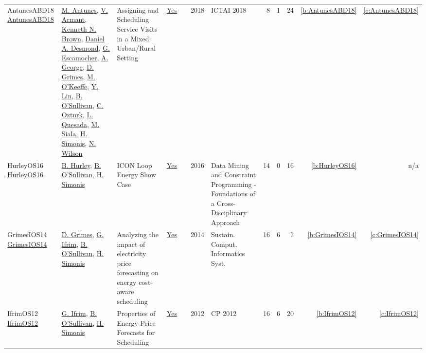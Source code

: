 {\begin{longtable}{>{\raggedright\arraybackslash}p{3cm}>{\raggedright\arraybackslash}p{6cm}>{\raggedright\arraybackslash}p{6.5cm}rrrp{2.5cm}rrrrr}
AntunesABD18 \href{https://doi.org/10.1109/ICTAI.2018.00027}{AntunesABD18} & \hyperref[auth:a891]{M. Antunes}, \hyperref[auth:a892]{V. Armant}, \hyperref[auth:a223]{Kenneth N. Brown}, \hyperref[auth:a893]{Daniel A. Desmond}, \hyperref[auth:a894]{G. Escamocher}, \hyperref[auth:a895]{A. George}, \hyperref[auth:a183]{D. Grimes}, \hyperref[auth:a896]{M. O'Keeffe}, \hyperref[auth:a897]{Y. Lin}, \hyperref[auth:a16]{B. O'Sullivan}, \hyperref[auth:a898]{C. Ozturk}, \hyperref[auth:a899]{L. Quesada}, \hyperref[auth:a130]{M. Siala}, \hyperref[auth:a17]{H. Simonis}, \hyperref[auth:a838]{N. Wilson} & Assigning and Scheduling Service Visits in a Mixed Urban/Rural Setting & \href{works/AntunesABD18.pdf}{Yes} & \cite{AntunesABD18} & 2018 & ICTAI 2018 & 8 & 1 & 24 & \ref{b:AntunesABD18} & \ref{c:AntunesABD18}\\
HurleyOS16 \href{https://doi.org/10.1007/978-3-319-50137-6\_15}{HurleyOS16} & \hyperref[auth:a900]{B. Hurley}, \hyperref[auth:a16]{B. O'Sullivan}, \hyperref[auth:a17]{H. Simonis} & {ICON} Loop Energy Show Case & \href{works/HurleyOS16.pdf}{Yes} & \cite{HurleyOS16} & 2016 & Data Mining and Constraint Programming - Foundations of a Cross-Disciplinary Approach & 14 & 0 & 16 & \ref{b:HurleyOS16} & n/a\\
GrimesIOS14 \href{https://doi.org/10.1016/j.suscom.2014.08.009}{GrimesIOS14} & \hyperref[auth:a183]{D. Grimes}, \hyperref[auth:a184]{G. Ifrim}, \hyperref[auth:a16]{B. O'Sullivan}, \hyperref[auth:a17]{H. Simonis} & Analyzing the impact of electricity price forecasting on energy cost-aware scheduling & \href{works/GrimesIOS14.pdf}{Yes} & \cite{GrimesIOS14} & 2014 & Sustain. Comput. Informatics Syst. & 16 & 6 & 7 & \ref{b:GrimesIOS14} & \ref{c:GrimesIOS14}\\
IfrimOS12 \href{https://doi.org/10.1007/978-3-642-33558-7\_68}{IfrimOS12} & \hyperref[auth:a184]{G. Ifrim}, \hyperref[auth:a16]{B. O'Sullivan}, \hyperref[auth:a17]{H. Simonis} & Properties of Energy-Price Forecasts for Scheduling & \href{works/IfrimOS12.pdf}{Yes} & \cite{IfrimOS12} & 2012 & CP 2012 & 16 & 6 & 20 & \ref{b:IfrimOS12} & \ref{c:IfrimOS12}\\
\end{longtable}
}

